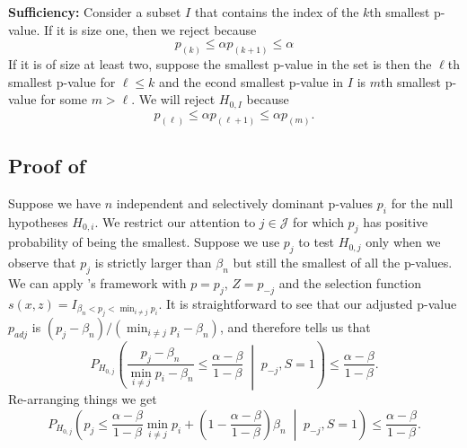 \documentclass{article}
\begin{document}
\begin{appendix}
\noindent \textbf{Sufficiency: } Consider a subset $I$ that contains the index of the $k$th smallest p-value. If it is size one, then we reject because
\begin{equation*}
    p_{(k)} \leq \alpha p_{(k+1)} \leq \alpha 
\end{equation*}
If it is of size at least two, suppose the smallest p-value in the set is then the $\ell$th smallest p-value for $\ell \leq k$ and the econd smallest p-value in $I$ is $m$th smallest p-value for some $m > \ell$. We will reject $H_{0, I}$ because 
\begin{equation*}
    p_{(\ell)} \leq \alpha p_{(\ell + 1)} \leq \alpha p_{(m)}.
\end{equation*}

\subsection{Proof of }

Suppose we have $n$ independent and selectively dominant p-values $p_i$ for the null hypotheses $H_{0, i}$. We restrict our attention to $j \in \mathcal{J}$ for which $p_j$ has positive probability of being the smallest. Suppose we use $p_j$ to test $H_{0, j}$ only when we observe that $p_j$ is strictly larger than $\beta_n$ but still the smallest of all the p-values. We can apply 's framework with $p=p_j$, $Z = p_{-j}$ and the selection function $s(x, z) = I_{\beta_n < p_j < \min_{i \neq j} p_i}$. It is straightforward to see that our adjusted p-value $p_{adj}$ is $(p_j - \beta_n)/(\min_{i \neq j} p_i - \beta_n)$, and  therefore tells us that 
\begin{equation*}
    P_{H_{0, j}}\left( \frac{p_j - \beta_n}{\min_{i \neq j} p_i - \beta_n} \leq \frac{\alpha -\beta}{1-\beta}  \;\middle|\; p_{-j}, S=1 \right) \leq \frac{\alpha - \beta}{1-\beta}.
\end{equation*}
Re-arranging things we get 
\begin{equation}
    \label{eq:hybrid_tool}
    P_{H_{0, j}}\left( p_j  \leq \frac{\alpha -\beta}{1-\beta}\min_{i \neq j} p_i  + \left( 1 - \frac{\alpha -\beta}{1-\beta}\right) \beta_n  \;\middle|\; p_{-j}, S=1  \right) \leq \frac{\alpha - \beta}{1-\beta}.
\end{equation}



\end{appendix}
\end{document}
